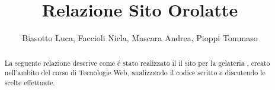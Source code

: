 \documentclass{article}
\title{Relazione Sito Orolatte}
\author{Biasotto Luca, Faccioli Nicla, Mascara Andrea, Pioppi Tommaso}
\date{}
\begin{document}
\maketitle

\begin{abstract}
La seguente relazione descrive come \'e stato realizzato il il sito per la gelateria , creato nell'ambito del corso di Tecnologie Web, analizzando il codice scritto e discutendo le scelte effettuate.
\end{abstract}

\end{document}
